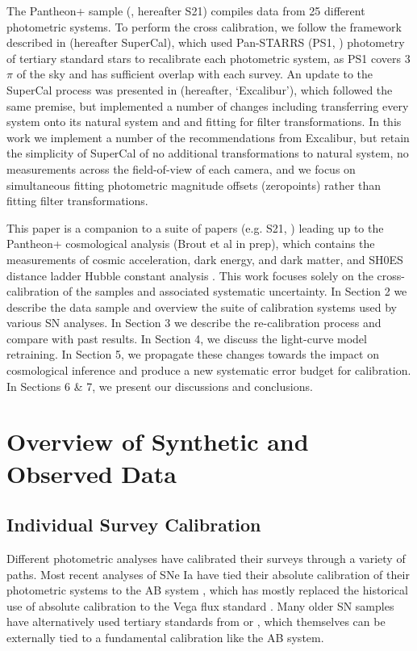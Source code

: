 \documentclass[twocolumn]{aastex63}
\newcommand{\blue}{\color{black}}
\newcommand{\red}{\color{black}}
\begin{document}
The Pantheon+ sample (\citealt{scolnic22}, hereafter S21) compiles data from 25 different photometric systems. To perform the cross calibration, we follow the framework described in \cite{Scolnic2015} (hereafter SuperCal), which used Pan-STARRS (PS1, \citealp{Chambers16}) photometry of tertiary standard stars to recalibrate each photometric system, as PS1 covers 3$\pi$ of the sky and has sufficient overlap with each survey.  An update to the SuperCal process was presented in \cite{Currie20} (hereafter, `Excalibur'), which followed the same premise, but implemented a number of changes including transferring every system onto its natural system and and fitting for filter transformations. In this work we implement a number of the recommendations from Excalibur, but retain the simplicity of SuperCal of no additional transformations to natural system, no measurements across the field-of-view of each camera, and we focus on simultaneous fitting photometric magnitude offsets (zeropoints) rather than fitting filter transformations. 

This paper is a companion to a suite of papers ({\red e.g. S21, \citealt{carr2021pantheon,peterson21,sasha21,popovic21,binningissinning,itsdust,dhawan20H0}}) leading up to the Pantheon+ cosmological analysis (Brout et al in prep), which contains the measurements of cosmic acceleration, dark energy, and dark matter, and SH0ES distance ladder Hubble constant analysis \citep{riess22}. This work focuses solely on the cross-calibration of the samples and associated systematic uncertainty. In Section 2 we describe the data sample and overview the suite of calibration systems used by various SN analyses.  In Section 3 we describe the re-calibration process and compare with past results.  In Section 4, we discuss the light-curve model retraining.  In Section 5, we propagate these changes towards the impact on cosmological inference and produce a new systematic error budget for calibration.  In Sections 6 \& 7, we present our discussions and conclusions.

\section{Overview of Synthetic and Observed Data}

\subsection{Individual Survey Calibration}

{\blue Different photometric analyses have calibrated their surveys through a variety of paths.  Most recent analyses of SNe Ia have tied their absolute calibration of their photometric systems to the AB system \citep{oke83,fukijita96}, which has mostly replaced the historical use of absolute calibration to the Vega flux standard \citep{vega}. Many older SN samples have alternatively used tertiary standards from \cite{landolt92} or \cite{smith02}, which themselves can be externally tied to a fundamental calibration like the AB system.}
\end{document}
